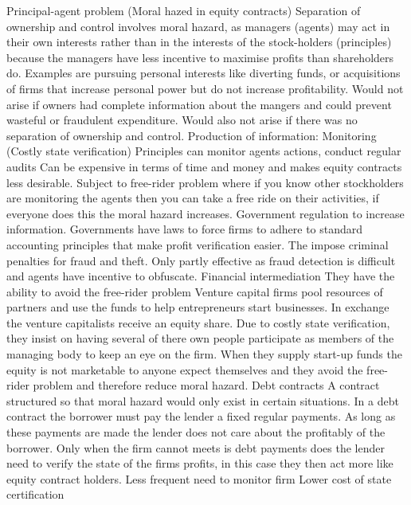 \documentclass[12pt]{examnotes}
\begin{document}
Principal-agent problem (Moral hazed in equity contracts)
\ra Separation of ownership and control involves moral hazard, as managers (agents) may act in their own interests rather than in the interests of the stock-holders (principles) because the managers have less incentive to maximise profits than shareholders do.
\ra Examples are pursuing personal interests like diverting funds, or acquisitions of firms that increase personal power but do not increase profitability.
\ra Would not arise if owners had complete information about the mangers and could prevent wasteful or fraudulent expenditure.
\ra Would also not arise if there was no separation of ownership and control.
\vspace{6pt}
 Production of information: Monitoring (Costly state verification)
\rna Principles can monitor agents actions, conduct regular audits
\rna Can be expensive in terms of time and money and makes equity contracts less desirable.
\rna Subject to free-rider problem where if you know other stockholders are monitoring the agents then you can take a free ride on their activities, if everyone does this the moral hazard increases.
 Government regulation to increase information.
\rna Governments have laws to force firms to adhere to standard accounting principles that make profit verification easier. 
\rna The impose criminal penalties for fraud and theft.
\rna Only partly effective as fraud detection is difficult and agents have incentive to obfuscate.
 Financial intermediation
\rna They have the ability to avoid the free-rider problem 
\rna Venture capital firms pool resources of partners and use the funds to help entrepreneurs start businesses. In exchange the venture capitalists receive an equity share. Due to costly state verification, they insist on having several of there own people participate as members of the managing body to keep an eye on the firm. When they supply start-up funds the equity is not marketable to anyone expect themselves and they avoid the free-rider problem and therefore reduce moral hazard.
 Debt contracts
\rna A contract structured so that moral hazard would only exist in certain situations.
\rna In a debt contract the borrower must pay the lender a fixed regular payments. As long as these payments are made the lender does not care about the profitably of the borrower.
\rna Only when the firm cannot meets is debt payments does the lender need to verify the state of the firms profits, in this case they then act more like equity contract holders.
\rna Less frequent need to monitor firm
\rna Lower cost of state certification
\end{document}
